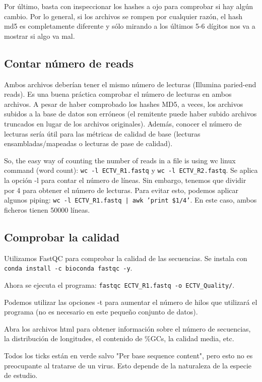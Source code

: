 Por último, basta con inspeccionar los hashes a ojo para comprobar si hay algún cambio. Por lo general, si los archivos se rompen por cualquier razón, el hash md5 es completamente diferente y sólo mirando a los últimos 5-6 dígitos nos va a mostrar si algo va mal.

\subsection{Contar número de reads}
Ambos archivos deberían tener el mismo número de lecturas (Illumina paried-end reads). Es una buena práctica comprobar el número de lecturas en ambos archivos. A pesar de haber comprobado los hashes MD5, a veces, los archivos subidos a la base de datos son erróneos (el remitente puede haber subido archivos truncados en lugar de los archivos originales). Además, conocer el número de lecturas sería útil para las métricas de calidad de base (lecturas ensambladas/mapeadas o lecturas de pase de calidad).

So, the easy way of counting the number of reads in a file is using wc linux command (word count): \texttt{wc -l ECTV\_R1.fastq} y \texttt{wc -l ECTV\_R2.fastq}. Se aplica la opción -l para contar el número de líneas. Sin embargo, tenemos que dividir por 4 para obtener el número de lecturas. Para evitar esto, podemos aplicar algunos piping:
\texttt{wc -l ECTV\_R1.fastq | awk '{print \$1/4}'}. En este caso, ambos ficheros tienen 50000 líneas.

\subsection{Comprobar la calidad}
Utilizamos FastQC para comprobar la calidad de las secuencias. Se instala con \texttt{conda install -c bioconda fastqc -y}.

Ahora se ejecuta el programa: \texttt{fastqc ECTV\_R1.fastq -o ECTV\_Quality/}.

Podemos utilizar las opciones -t para aumentar el número de hilos que utilizará el programa (no es necesario en este pequeño conjunto de datos).

Abra los archivos html para obtener información sobre el número de secuencias, la distribución de longitudes, el contenido de \%GCs, la calidad media, etc.

Todos los ticks están en verde salvo "Per base sequence content", pero esto no es preocupante al tratarse de un virus. Esto depende de la naturaleza de la especie de estudio. 

